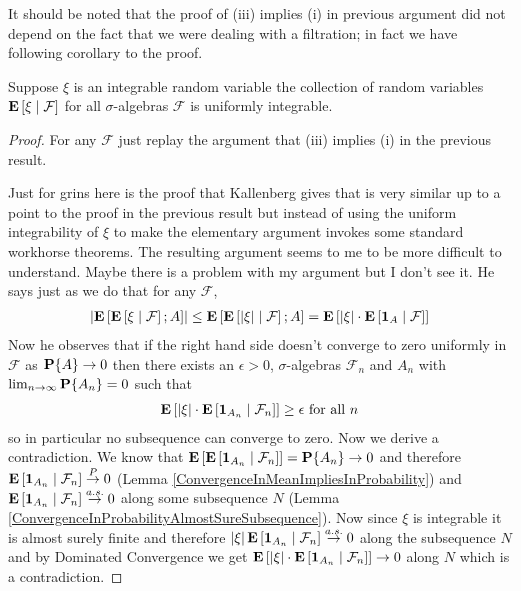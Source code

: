It should be noted that the proof of (iii) implies (i) in previous
argument did not depend on the fact that we were dealing with a
filtration; in fact we have following corollary to the proof.
\begin{cor}\label{ConditionalExpectationsUniformlyIntegrable}Suppose $\xi$ is an integrable random variable the
  collection of random variables $\cexpectationlong{\mathcal{F}}{\xi}$
  for all $\sigma$-algebras $\mathcal{F}$ is uniformly integrable.
\end{cor}
\begin{proof}For any $\mathcal{F}$ just replay the argument that (iii) implies (i) in the
  previous result.

Just for grins here is the proof that Kallenberg gives that is very
similar up to a point to the proof in the previous result but instead of
using the uniform integrability of $\xi$ to make the elementary
argument invokes some standard workhorse theorems.  The resulting
argument seems to me to be more difficult to understand.  Maybe there
is a problem with my argument but I don't see it.  He says
just as we do that for any $\mathcal{F}$,
\begin{align*}
\abs{\expectation{\cexpectationlong{\mathcal{F}}{\xi} ; A}} &\leq
\expectation{\cexpectationlong{\mathcal{F}}{\abs{\xi}} ; A} =\expectation{\abs{\xi} \cdot \cexpectationlong{\mathcal{F}}{\characteristic{A}}} \\
\end{align*}
Now he observes that if the right hand side doesn't converge to zero
uniformly in $\mathcal{F}$ as $\probability{A} \to 0$ then there
exists an $\epsilon > 0$, $\sigma$-algebras $\mathcal{F}_n$ and $A_n$
with $\lim_{n \to \infty} \probability{A_n} = 0$ such that 
\begin{align*}
\expectation{\abs{\xi} \cdot
  \cexpectationlong{\mathcal{F}_n}{\characteristic{A_n}}} \geq
\epsilon \text{ for all $n$}
\end{align*}
so in particular no subsequence can converge to zero.  Now we derive a
contradiction. We know that
$\expectation{\cexpectationlong{\mathcal{F}_n}{\characteristic{A_n}}}
= \probability{A_n} \to 0$ and therefore
$\cexpectationlong{\mathcal{F}_n}{\characteristic{A_n}} \toprob 0$
(Lemma \ref{ConvergenceInMeanImpliesInProbability}) and
$\cexpectationlong{\mathcal{F}_n}{\characteristic{A_n}} \toas 0$ along
some subsequence $N$ (Lemma
\ref{ConvergenceInProbabilityAlmostSureSubsequence}).  Now since $\xi$
is integrable it is almost surely finite and therefore
$\abs{\xi} \cexpectationlong{\mathcal{F}_n}{\characteristic{A_n}} \toas 0$ along
the subsequence $N$ and by
Dominated Convergence we get $\expectation{\abs{\xi} \cdot
  \cexpectationlong{\mathcal{F}_n}{\characteristic{A_n}}} \to 0$
along $N$ which is a contradiction.
\end{proof}


